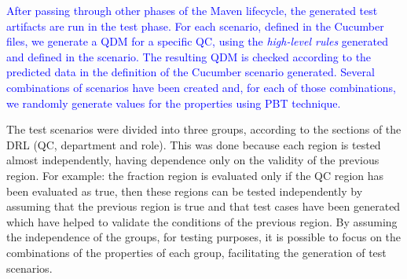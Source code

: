 \documentclass[AMA,STIX1COL,hidelinks]{WileyNJD-v2}
\newcommand{\callers}{\emph{high-level rules}\xspace}
\begin{document}
\textcolor{blue}{
After passing through other phases of the Maven lifecycle, the generated test artifacts are run in the test phase. For each scenario, defined in the Cucumber files, we generate a QDM for a specific QC, using the \callers generated and defined in the scenario. The resulting QDM is checked according to the predicted data in the definition of the Cucumber scenario generated. Several combinations of scenarios have been created and, for each of those combinations, we randomly generate values for the properties using PBT technique.}



The test scenarios were divided into three groups, according to the sections of the DRL (QC, department and role). This was done because each region is tested almost independently, having dependence only on the validity of the previous region. For example: the fraction region is evaluated only if the QC region has been evaluated as true, then these regions can be tested independently by assuming that the previous region is true and that test cases have been generated which have helped to validate the conditions of the previous region. By assuming the independence of the groups, for testing purposes, it is possible to focus on the combinations of the properties of each group, facilitating the generation of test scenarios.
\end{document}
